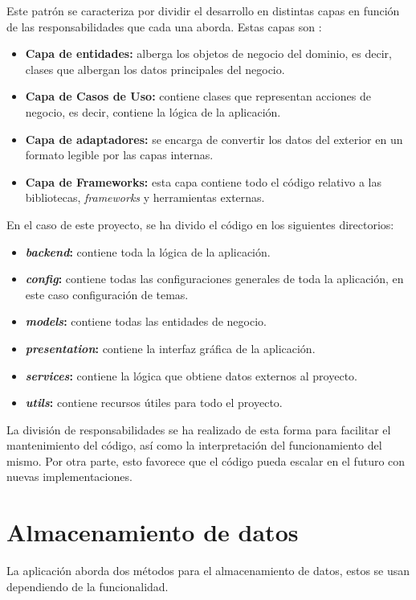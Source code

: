 Este patrón se caracteriza por dividir el desarrollo en distintas capas en función de las responsabilidades que cada una aborda. Estas capas son \cite{arquitectura_medium}:
\begin{itemize}
    \item \textbf{Capa de entidades:} alberga los objetos de negocio del dominio, es decir, clases que albergan los datos principales del negocio.
    \item \textbf{Capa de Casos de Uso:} contiene clases que representan acciones de negocio, es decir, contiene la lógica de la aplicación.
    \item \textbf{Capa de adaptadores:} se encarga de convertir los datos del exterior en un formato legible por las capas internas.
    \item \textbf{Capa de Frameworks:} esta capa contiene todo el código relativo a las bibliotecas, \textit{frameworks} y herramientas externas.
\end{itemize}

En el caso de este proyecto, se ha divido el código en los siguientes directorios:
\begin{itemize}
    \item \textbf{\textit{backend}:} contiene toda la lógica de la aplicación.
    \item \textbf{\textit{config}:} contiene todas las configuraciones generales de toda la aplicación, en este caso configuración de temas.
    \item \textbf{\textit{models}:} contiene todas las entidades de negocio.
    \item \textbf{\textit{presentation}:} contiene la interfaz gráfica de la aplicación.
    \item \textbf{\textit{services}:} contiene la lógica que obtiene datos externos al proyecto.
    \item \textbf{\textit{utils}:} contiene recursos útiles para todo el proyecto.
\end{itemize}
La división de responsabilidades se ha realizado de esta forma para facilitar el mantenimiento del código, así como la interpretación del funcionamiento del mismo. Por otra parte, esto favorece que el código pueda escalar en el futuro con nuevas implementaciones.

\section{Almacenamiento de datos}
La aplicación aborda dos métodos para el almacenamiento de datos, estos se usan dependiendo de la funcionalidad.

